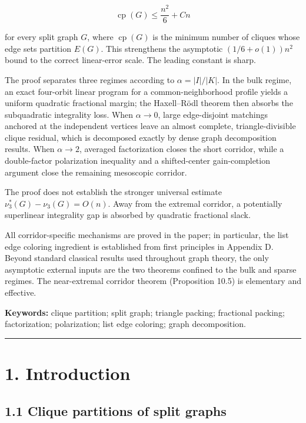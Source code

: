 \documentclass[
  11pt,
]{article}
\begin{document}
\[
\operatorname{cp}(G)
\le
\frac{n^2}{6}+Cn
\]

for every split graph \(G\), where \(\operatorname{cp}(G)\) is the
minimum number of cliques whose edge sets partition \(E(G)\). This
strengthens the asymptotic \((1/6+o(1))n^2\) bound to the correct
linear-error scale. The leading constant is sharp.

The proof separates three regimes according to \(\alpha=|I|/|K|\). In
the bulk regime, an exact four-orbit linear program for a
common-neighborhood profile yields a uniform quadratic fractional
margin; the Haxell--Rödl theorem then absorbs the subquadratic
integrality loss. When \(\alpha\to0\), large edge-disjoint matchings
anchored at the independent vertices leave an almost complete,
triangle-divisible clique residual, which is decomposed exactly by dense
graph decomposition results. When \(\alpha\to2\), averaged factorization
closes the short corridor, while a double-factor polarization inequality
and a shifted-center gain-completion argument close the remaining
mesoscopic corridor.

The proof does not establish the stronger universal estimate
\(\nu_3^*(G)-\nu_3(G)=O(n)\). Away from the extremal corridor, a
potentially superlinear integrality gap is absorbed by quadratic
fractional slack.

All corridor-specific mechanisms are proved in the paper; in particular,
the list edge coloring ingredient is established from first principles
in Appendix D. Beyond standard classical results used throughout graph
theory, the only asymptotic external inputs are the two theorems
confined to the bulk and sparse regimes. The near-extremal corridor
theorem (Proposition 10.5) is elementary and effective.

\textbf{Keywords:} clique partition; split graph; triangle packing;
fractional packing; factorization; polarization; list edge coloring;
graph decomposition.

\begin{center}\rule{0.5\linewidth}{0.5pt}\end{center}

\section{1. Introduction}\label{introduction}

\subsection{1.1 Clique partitions of split
graphs}\label{clique-partitions-of-split-graphs}
\end{document}
